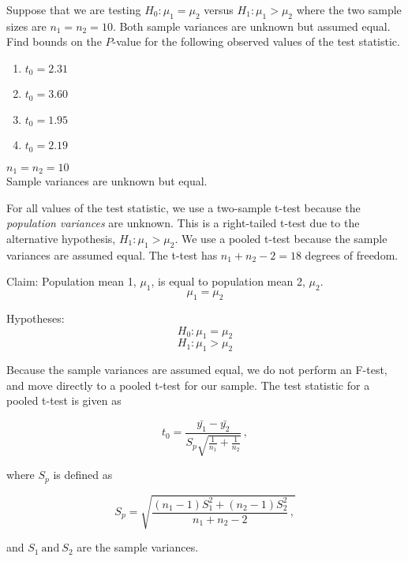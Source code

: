 \documentclass[../main.tex]{subfiles}
\begin{document}

Suppose that we are testing \(H_0 : \mu_1 = \mu_2\) versus \(H_1 : \mu_1 > \mu_2\) where the two sample sizes are \(n_1 = n_2 = 10\).
Both sample variances are unknown but assumed equal. Find bounds on the $P$-value for the following observed values of the test statistic.

\begin{enumerate}[label = (\alph*)]
    \item \(t_0 = 2.31\)
    \item \(t_0 = 3.60\)
    \item \(t_0 = 1.95\)
    \item \(t_0 = 2.19\)
\end{enumerate}

\givens{}
\(n_1 = n_2 = 10\) \\
Sample variances are unknown but equal.

\assumptions{}
For all values of the test statistic, we use a two-sample t-test because the \textit{population variances} are unknown.
This is a right-tailed t-test due to the alternative hypothesis, \(H_1 : \mu_1 > \mu_2\).
We use a pooled t-test because the sample variances are assumed equal. 
The t-test has \(n_1+n_2-2 = 18\) degrees of freedom.

\solution{}

Claim: Population mean 1, \(\mu_1\), is equal to population mean 2, \(\mu_2\).
\[\mu_1 = \mu_2\]

Hypotheses:
\[H_0 : \mu_1 = \mu_2\] 
\[H_1 : \mu_1 > \mu_2\]
   
 Because the sample variances are assumed equal, we do not perform an F-test, and move directly to a pooled t-test for our sample.
 The test statistic for a pooled t-test is given as

 \[
    t_0 = \frac{\bar{y_1}-\bar{y_2}}{S_p \sqrt{\frac{1}{n_1} + \frac{1}{n_2}}}   \, ,
 \]

where \(S_p\) is defined as

\[
    S_p = \sqrt{
        \frac{(n_1-1)S_1^2 + (n_2-1)S_2^2}{n_1+n_2-2} \, ,
    }  
\]

and \(S_1 \ \textrm{and} \ S_2\) are the sample variances.

\par
\end{document}
